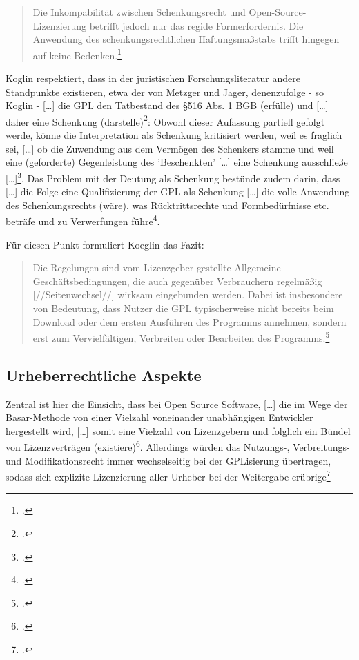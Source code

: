 \documentclass[DIV=calc,BCOR=5mm,11pt,headings=small,oneside,abstract=true, toc=bib]{scrartcl}
\begin{document}
\begin{quote}\glqq{}Die Inkompabilität zwischen Schenkungsrecht und
Open-Source-Lizenzierung betrifft jedoch nur das regide Formerfordernis.
Die Anwendung des schenkungsrechtlichen Haftungsmaßstabs trifft hingegen
auf keine Bedenken.\grqq{}\footcite[][62 - Typo(?) im Original, gemeint ist
wahrscheinlich die Inkompatibilität]{Koglin2007a}
\end{quote}

Koglin respektiert, dass in der juristischen Forschungsliteratur andere
Standpunkte existieren, etwa der von Metzger und Jager, denenzufolge - so Koglin
- \glqq{}[\ldots] die GPL den Tatbestand des §516 Abs. 1 BGB (erfülle)
und [\ldots] daher eine Schenkung
(darstelle)\grqq{}\footcite[vgl.][38]{Koglin2007a}: Obwohl dieser Aufassung
partiell gefolgt werde, könne die Interpretation als Schenkung kritisiert
werden, weil es fraglich sei, \glqq{}[\ldots] ob die Zuwendung aus dem
Vermögen des Schenkers stamme\grqq{} und weil eine (geforderte)
\glqq{}Gegenleistung\grqq{} des 'Beschenkten' \glqq{}[\ldots] eine
Schenkung ausschließe [\ldots]\grqq{}\footcite[vgl.][39]{Koglin2007a}. Das
Problem mit der Deutung als Schenkung bestünde zudem darin, dass \glqq{}[\ldots]
die Folge eine Qualifizierung der GPL als Schenkung [\ldots] die volle
Anwendung des Schenkungsrechts (wäre)\grqq{}, was Rücktrittsrechte und
\glqq{}Formbedürfnisse\grqq{} etc. beträfe und zu Verwerfungen
führe\footcite[vgl.][52ff]{Koglin2007a}.

Für diesen Punkt formuliert Koeglin das Fazit:

\begin{quote}\glqq{}Die Regelungen sind vom Lizenzgeber gestellte Allgemeine
Geschäftsbedingungen, die auch gegenüber Verbrauchern regelmäßig
[//Seitenwechsel//] wirksam eingebunden werden. Dabei ist insbesondere von
Bedeutung, dass Nutzer die GPL typischerweise nicht bereits beim Download oder
dem ersten Ausführen des Programms annehmen, sondern erst zum Vervielfältigen,
Verbreiten oder Bearbeiten des
Programms.\grqq{}\footcite[vgl.][228]{Koglin2007a}
\end{quote}

\subsection{Urheberrechtliche Aspekte}

Zentral ist hier die Einsicht, dass bei Open Source Software, \glqq{}[\ldots]
die im Wege der Basar-Methode von einer Vielzahl voneinander unabhängigen
Entwickler hergestellt wird, [\ldots] somit eine Vielzahl von
Lizenzgebern und folglich ein Bündel von Lizenzverträgen
(existiere)\grqq{}\footcite[vgl.][225]{Koglin2007a}. Allerdings würden das
Nutzungs-, Verbreitungs- und Modifikationsrecht immer wechselseitig bei der
GPLisierung übertragen, sodass sich explizite Lizenzierung aller Urheber bei der
Weitergabe erübrige\footcite[vgl.][133]{Koglin2007a}
\end{document}
